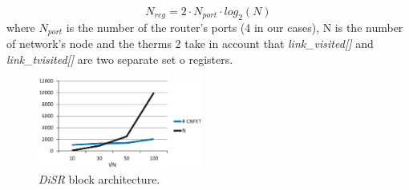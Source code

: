 \begin{equation}
  \label{eq:imp_trend}
  N_{reg}=2\cdot N_{port} \cdot log_2(N)
\end{equation}
where $N_{port}$ is the number of the router's ports (4 in our cases), N is the number 
of network's node and the therms 2 take in account that \emph{link\_visited[]} and 
\emph{link\_tvisited[]} are two separate set o registers.




\begin{figure}
  \centering
  \includegraphics[width=0.48\textwidth]{pictures/imp.eps}
  \caption{\emph{DiSR} block architecture.}
 \label{fig:imp_trend}
\end{figure}